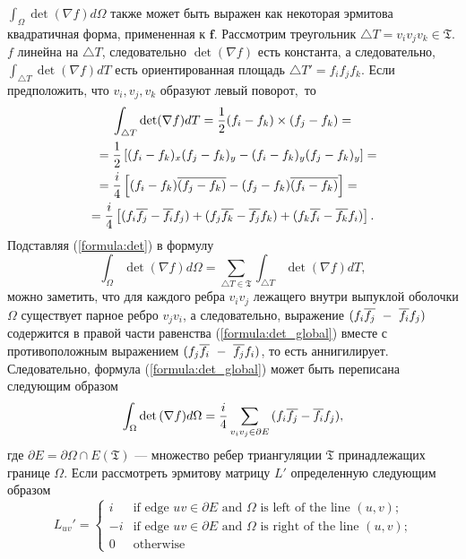 $\int_{\Omega} \det(\nabla f) d\Omega$ также может быть выражен как некоторая 
эрмитова квадратичная форма, примененная к $\mathbf{f}$. 
Рассмотрим треугольник $\triangle T = v_i v_j v_k \in \mathfrak{T}$. 
$f$ линейна на $\triangle T$, следовательно $\det (\nabla f)$ есть константа, 
а следовательно, $\int_{\triangle T} \det (\nabla f) dT$ есть ориентированная площадь 
$\triangle T' = f_i f_j f_k$. 
Если предположить, что $v_i, v_j, v_k$ образуют левый поворот,~то
\begin{multline}
  \label{formula:det}
  \int_{\triangle T} \det (\nabla f) dT = \frac{1}{2} (f_i - f_k) \times (f_j - f_k) = \\
  \shoveleft{= \frac{1}{2} \left[(f_i - f_k)_x (f_j - f_k)_y - (f_i - f_k)_y (f_j - f_k)_y \right] =} \\
  \shoveleft{= \frac{i}{4} \left[ (f_i - f_k)\conjugate{(f_j - f_k)} - (f_j - f_k) \conjugate{(f_i - f_k)} \right] = } \\
  = \frac{i}{4} \left[ (f_i \conjugate{f_j} - \conjugate{f_i} f_j) + (f_j \conjugate{f_k} - \conjugate{f_j} f_k) + 
    (f_k \conjugate{f_i} - \conjugate{f_k} f_i) \right].  
\end{multline}
Подставляя (\ref{formula:det}) в формулу
\begin{equation}
  \label{formula:det_global}
  \int_{\Omega} \det {\left( \nabla f \right) } d\Omega = \sum_{\triangle T \in \mathfrak{T}}{ \int_{\triangle T} \det{ \left(\nabla f \right) } dT},
\end{equation}
можно заметить, что для каждого ребра $v_i v_j$ лежащего внутри выпуклой оболочки $\Omega$  
существует парное ребро $v_j v_i$, а следовательно, выражение 
$(f_i \overline{f_j}~-~\overline{f_i} f_j)$ содержится в правой части равенства (\ref{formula:det_global}) 
вместе с противоположным выражением $(f_j \overline{f_i}~-~\overline{f_j} f_i)$, то есть аннигилирует. 
Следовательно, формула (\ref{formula:det_global}) может быть переписана следующим образом
\begin{equation}
\label{formula:det_over_edges}
  \int_{\Omega} \det {\left( \nabla f \right) } d\Omega = \frac{i}{4} \sum_{v_i v_j \in \partial E}{(f_i \overline{f_j} - \overline{f_i} f_j)},
\end{equation}
где $\partial E = \partial \Omega \cap E(\mathfrak{T})$ --- множество ребер 
триангуляции $\mathfrak{T}$ принадлежащих границе $\Omega$. 
Если рассмотреть эрмитову матрицу $L'$ определенную следующим образом
\begin{equation*}
  \textstyle L_{uv}' = \begin{cases}
    i  & \text{if edge $uv \in \partial E$ and $\Omega$ is left of the line $(u, v)$;} \\ 
    -i & \text{if edge $uv \in \partial E$ and $\Omega$ is right of the line $(u, v)$;} \\ 
    0  & \text{otherwise}
  \end{cases}
\end{equation*}
